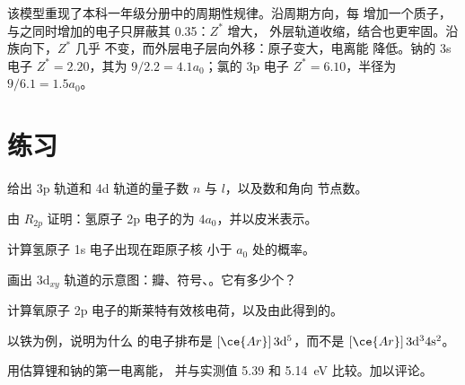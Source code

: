 该模型重现了本科一年级分册中的周期性规律。沿周期方向，每
增加一个质子，与之同时增加的电子只屏蔽其 0.35：$Z^*$ 增大，
外层轨道收缩，结合也更牢固。沿族向下，$Z^*$ 几乎
不变，而外层电子层向外移：原子变大，电离能
降低。钠的 3s 电子 $Z^* = 2.20$，其为
$9/2.2 = 4.1a_0$；氯的 3p 电子 $Z^* = 6.10$，半径为 $9/6.1 = 1.5a_0$。

\section{练习}

\begin{exercise}[$\star$]\label{exo:b2:atomic-orbitals:1}
给出 3p 轨道和 4d 轨道的量子数 $n$ 与 $l$，以及数和角向
节点数。
\end{exercise}

\begin{exercise}[$\star$]\label{exo:b2:atomic-orbitals:2}
由 $R_{2p}$ 证明：氢原子 2p 电子的为
$4a_0$，并以皮米表示。
\end{exercise}

\begin{exercise}[$\star$]\label{exo:b2:atomic-orbitals:3}
计算氢原子 1s 电子出现在距原子核
小于 $a_0$ 处的概率。
\end{exercise}

\begin{exercise}[$\star$]\label{exo:b2:atomic-orbitals:4}
画出 $3\mathrm d_{xy}$ 轨道的示意图：瓣、符号、。它有多少个？
\end{exercise}

\begin{exercise}[$\star\star$]\label{exo:b2:atomic-orbitals:5}
计算氧原子 2p 电子的斯莱特有效核电荷，以及由此得到的。
\end{exercise}

\begin{exercise}[$\star\star$]\label{exo:b2:atomic-orbitals:6}
以铁为例，说明为什么  的电子排布是
$[\ce{Ar}]\,3\mathrm d^5$，而不是 $[\ce{Ar}]\,3\mathrm d^3 4\mathrm s^2$。
\end{exercise}

\begin{exercise}[$\star\star$]\label{exo:b2:atomic-orbitals:7}
用估算锂和钠的第一电离能，
并与实测值 5.39 和 \qty{5.14}{eV} 比较。加以评论。
\end{exercise}

